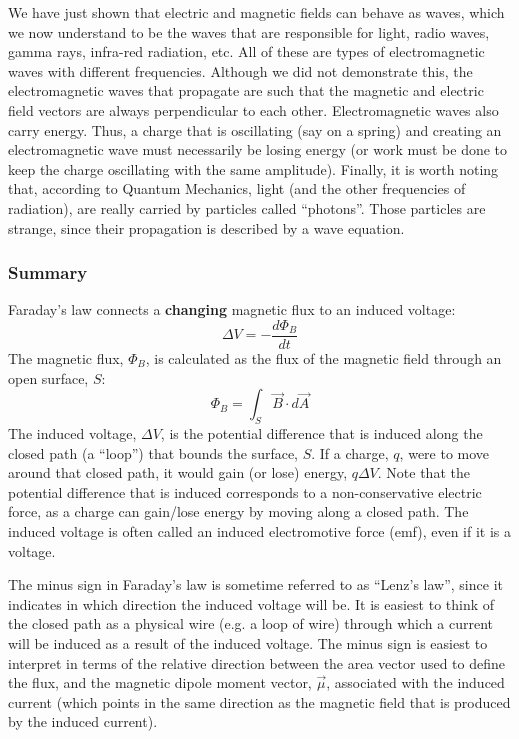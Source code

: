 We have just shown that electric and magnetic fields can behave as waves, which we now understand to be the waves that are responsible for light, radio waves, gamma rays, infra-red radiation, etc. All of these are types of electromagnetic waves with different frequencies. Although we did not demonstrate this, the electromagnetic waves that propagate are such that the magnetic and electric field vectors are always perpendicular to each other. Electromagnetic waves also carry energy. Thus, a charge that is oscillating (say on a spring) and creating an electromagnetic wave must necessarily be losing energy (or work must be done to keep the charge oscillating with the same amplitude). Finally, it is worth noting that, according to Quantum Mechanics, light (and the other frequencies of radiation), are really carried by particles called ``photons''. Those particles are strange, since their propagation is described by a wave equation.

\subsubsection{Summary}

Faraday's law connects a \textbf{changing} magnetic flux to an induced voltage:
\begin{equation}
\Delta V = -\frac{d\Phi_B}{dt}
\end{equation}
The magnetic flux, $\Phi_B$, is calculated as the flux of the magnetic field through an open surface, $S$:
\begin{equation}
\Phi_B = \int_S \vec B\cdot d\vec A
\end{equation}
The induced voltage, $\Delta V$, is the potential difference that is induced along the closed path (a ``loop'') that bounds the surface, $S$. If a charge, $q$, were to move around that closed path, it would gain (or lose) energy, $q\Delta V$. Note that the potential difference that is induced corresponds to a non-conservative electric force, as a charge can gain/lose energy by moving along a closed path. The induced voltage is often called an induced electromotive force (emf), even if it is a voltage.

The minus sign in Faraday's law is sometime referred to as ``Lenz's law'', since it indicates in which direction the induced voltage will be. It is easiest to think of the closed path as a physical wire (e.g. a loop of wire) through which a current will be induced as a result of the induced voltage. The minus sign is easiest to interpret in terms of the relative direction between the area vector used to define the flux, and the magnetic dipole moment vector, $\vec \mu$, associated with the induced current (which points in the same direction as the magnetic field that is produced by the induced current).

